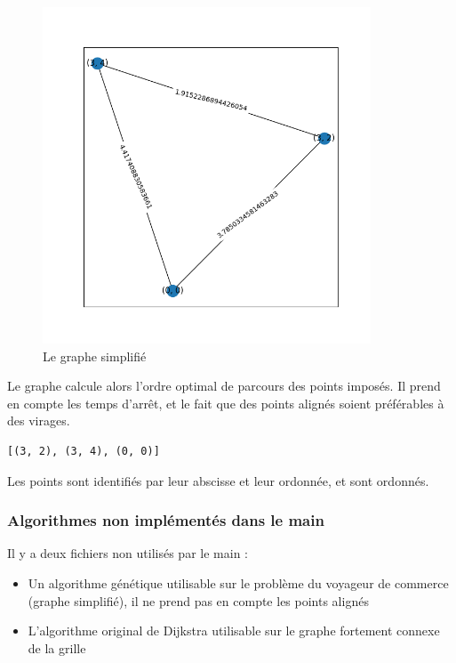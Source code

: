 \begin{figure}
	\centering
	\includegraphics[height=10cm]{grapheSimp2.png}
	\caption{Le graphe simplifié}
	\label{fig:grapheSimp2}
\end{figure}
Le graphe calcule alors l'ordre optimal de parcours des points imposés. Il prend en compte les temps d'arrêt, et le fait que des points alignés soient préférables à des virages.
\begin{verbatim}
[(3, 2), (3, 4), (0, 0)]
\end{verbatim}
Les points sont identifiés par leur abscisse et leur ordonnée, et sont ordonnés.
\subsubsection*{Algorithmes non implémentés dans le main}
Il y a deux fichiers non utilisés par le main :
\begin{itemize}
	\item Un algorithme génétique utilisable sur le problème du voyageur de commerce (graphe simplifié), il ne prend pas en compte les points alignés
	\item L'algorithme original de Dijkstra utilisable sur le graphe fortement connexe de la grille
\end{itemize}
